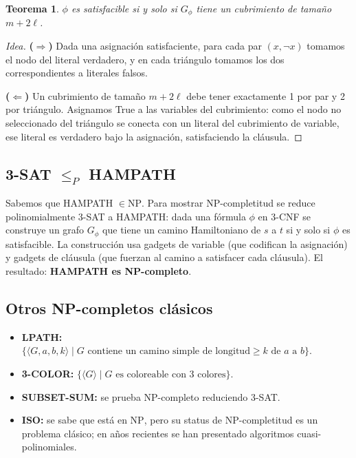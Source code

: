 \documentclass[11pt,a4paper]{article}
\theoremstyle{definicion}
\newtheorem{teorema}[definicion]{Teorema}
\newcommand{\enc}[1]{\langle #1 \rangle}
\newcommand{\redP}{\leq_{P}}
\newcommand{\NP}{\mathrm{NP}}
\begin{document}
\begin{teorema}
$\phi$ es satisfacible si y solo si $G_\phi$ tiene un cubrimiento de tama\~no $m + 2\ell$.
\end{teorema}

\begin{proof}[Idea]
\textbf{($\Rightarrow$)} Dada una asignaci\'on satisfaciente, para cada par $(x, \neg x)$ tomamos el nodo del literal verdadero, y en cada tri\'angulo tomamos los dos correspondientes a literales falsos.

\textbf{($\Leftarrow$)} Un cubrimiento de tama\~no $m + 2\ell$ debe tener exactamente 1 por par y 2 por tri\'angulo. Asignamos True a las variables del cubrimiento: como el nodo no seleccionado del tri\'angulo se conecta con un literal del cubrimiento de variable, ese literal es verdadero bajo la asignaci\'on, satisfaciendo la cl\'ausula.
\end{proof}

\subsection{3-SAT $\redP$ HAMPATH}

Sabemos que HAMPATH $\in \NP$. Para mostrar NP-completitud se reduce polinomialmente 3-SAT a HAMPATH: dada una f\'ormula $\phi$ en 3-CNF se construye un grafo $G_\phi$ que tiene un camino Hamiltoniano de $s$ a $t$ si y solo si $\phi$ es satisfacible. La construcci\'on usa gadgets de variable (que codifican la asignaci\'on) y gadgets de cl\'ausula (que fuerzan al camino a satisfacer cada cl\'ausula). El resultado: \textbf{HAMPATH es NP-completo}.

\subsection{Otros NP-completos cl\'asicos}

\begin{itemize}
    \item \textbf{LPATH:} $\{\enc{G, a, b, k} \mid G \text{ contiene un camino simple de longitud} \geq k \text{ de } a \text{ a } b\}$.
    \item \textbf{3-COLOR:} $\{\enc{G} \mid G \text{ es coloreable con 3 colores}\}$.
    \item \textbf{SUBSET-SUM:} se prueba NP-completo reduciendo 3-SAT.
    \item \textbf{ISO:} se sabe que est\'a en $\NP$, pero su status de NP-completitud es un problema cl\'asico; en a\~nos recientes se han presentado algoritmos cuasi-polinomiales.
\end{itemize}
\end{document}
